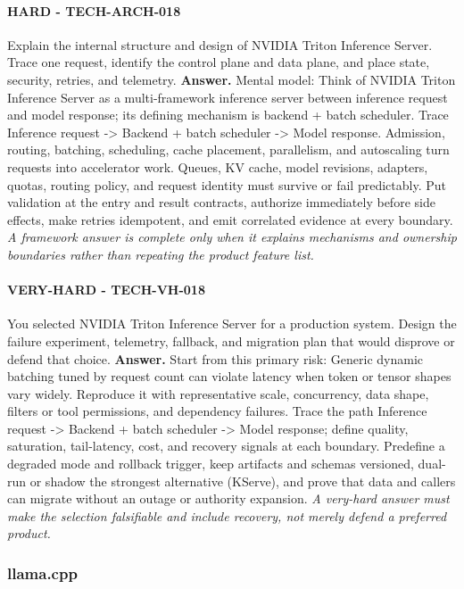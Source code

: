 \paragraph{HARD - TECH-ARCH-018} Explain the internal structure and design of NVIDIA Triton Inference Server. Trace one request, identify the control plane and data plane, and place state, security, retries, and telemetry.
\textbf{Answer.} Mental model: Think of NVIDIA Triton Inference Server as a multi-framework inference server between inference request and model response; its defining mechanism is backend + batch scheduler. Trace Inference request -> Backend + batch scheduler -> Model response. Admission, routing, batching, scheduling, cache placement, parallelism, and autoscaling turn requests into accelerator work. Queues, KV cache, model revisions, adapters, quotas, routing policy, and request identity must survive or fail predictably. Put validation at the entry and result contracts, authorize immediately before side effects, make retries idempotent, and emit correlated evidence at every boundary.
\textit{A framework answer is complete only when it explains mechanisms and ownership boundaries rather than repeating the product feature list.}
\paragraph{VERY-HARD - TECH-VH-018} You selected NVIDIA Triton Inference Server for a production system. Design the failure experiment, telemetry, fallback, and migration plan that would disprove or defend that choice.
\textbf{Answer.} Start from this primary risk: Generic dynamic batching tuned by request count can violate latency when token or tensor shapes vary widely. Reproduce it with representative scale, concurrency, data shape, filters or tool permissions, and dependency failures. Trace the path Inference request -> Backend + batch scheduler -> Model response; define quality, saturation, tail-latency, cost, and recovery signals at each boundary. Predefine a degraded mode and rollback trigger, keep artifacts and schemas versioned, dual-run or shadow the strongest alternative (KServe), and prove that data and callers can migrate without an outage or authority expansion.
\textit{A very-hard answer must make the selection falsifiable and include recovery, not merely defend a preferred product.}
\subsubsection*{llama.cpp}
